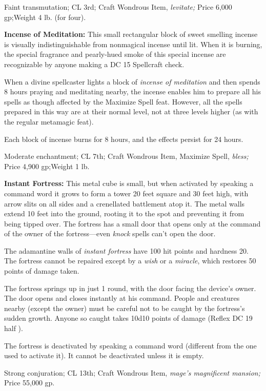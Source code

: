 Faint transmutation; CL 3rd; Craft Wondrous Item, \textit{levitate; }Price 6,000 
gp;Weight 4 lb. (for four).

\textbf{Incense of Meditation: }This small rectangular block of sweet smelling 
incense is visually indistinguishable from nonmagical incense until lit. When it 
is burning, the special fragrance and pearly-hued smoke of this special incense 
are recognizable by anyone making a DC 15 Spellcraft check.

When a divine spellcaster lights a block of \textit{incense of meditation }and 
then spends 8 hours praying and meditating nearby, the incense enables him to prepare 
all his spells as though affected by the Maximize Spell feat. However, all the 
spells prepared in this way are at their normal level, not at three levels higher 
(as with the regular metamagic feat).

Each block of incense burns for 8 hours, and the effects persist for 24 hours.

Moderate enchantment; CL 7th; Craft Wondrous Item, Maximize Spell, \textit{bless; 
}Price 4,900 gp;Weight 1 lb.

\textbf{Instant Fortress:} This metal cube is small, but when activated by speaking 
a command word it grows to form a tower 20 feet square and 30 feet high, with arrow 
slits on all sides and a crenellated battlement atop it. The metal walls extend 
10 feet into the ground, rooting it to the spot and preventing it from being tipped 
over. The fortress has a small door that opens only at the command of the owner 
of the fortress---even \textit{knock }spells can't open the door.

The adamantine walls of \textit{instant fortress }have 100 hit points and hardness 
20. The fortress cannot be repaired except by a \textit{wish }or a \textit{miracle}, 
which restores 50 points of damage taken.

The fortress springs up in just 1 round, with the door facing the device's owner. 
The door opens and closes instantly at his command. People and creatures nearby 
(except the owner) must be careful not to be caught by the fortress's sudden growth. 
Anyone so caught takes 10d10 points of damage (Reflex DC 19 half ).

The fortress is deactivated by speaking a command word (different from the one 
used to activate it). It cannot be deactivated unless it is empty.

Strong conjuration; CL 13th; Craft Wondrous Item, \textit{mage's magnificent mansion; 
}Price 55,000 gp.

